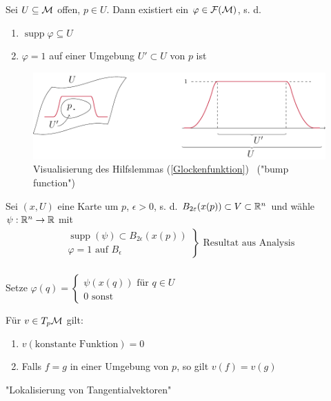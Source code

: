 \begin{hlem}
Sei $U \subseteq \mathcal{M}$ offen, $p \in U$. Dann existiert ein $\varphi \in \mathcal{F}(\mathcal{M})$, s. d. 
\begin{enumerate}\label{Glockenfunktion}
\item$\operatorname{supp}\varphi\subseteq U$
\item$\varphi=1$ auf einer Umgebung $U' \subset U$ von $p$ ist
\end{enumerate}
\end{hlem}

\begin{figure}[H]
\centering 
\includegraphics[scale=0.8]{figures/tikz/bump_function.pdf}
\caption{Visualisierung des Hilfslemmas  (\ref{Glockenfunktion}) \  ("bump function") }
\end{figure}

\begin{bew}
Sei $(x, U)$ eine Karte um $p$, $\epsilon > 0$, s. d. $B_{2\varepsilon}(x(p))\subset V\subset \mathbb{R}^n$ und wähle $\psi:\mathbb{R}^n\rightarrow\mathbb{R}$ mit 
\begin{align*}
\left.
\begin{array}{r}
\operatorname{supp}(\psi)\subset B_{2\epsilon}(x(p))\\
\varphi = 1 \text{ auf } B_\epsilon
\end{array}
\right\} \text{ Resultat aus Analysis}\\
\end{align*}

Setze $\varphi(q) = \left\{
\begin{array}{l}
\psi(x(q))\text{ für }q\in U\\
0 \text{ sonst}
\end{array}
\right.$
\end{bew}

\begin{satz}
Für $v\in T_p \mathcal{M}$ gilt:
\begin{enumerate}
\item$v(\text{konstante Funktion}) = 0$
\item Falls $f = g$ in einer Umgebung von $p$, so gilt $v(f) = v(g)$
\end{enumerate}
"Lokalisierung von Tangentialvektoren"
\end{satz}

